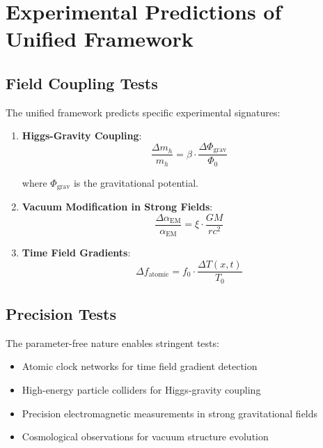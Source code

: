 \documentclass[12pt,a4paper]{article}
\newcommand{\Tfieldt}{T(x,t)}
\newcommand{\Tzero}{T_0}
\begin{document}
	\section{Experimental Predictions of Unified Framework}
	\label{sec:experimental_predictions}
	
	\subsection{Field Coupling Tests}
	\label{subsec:field_coupling_tests}
	
	The unified framework predicts specific experimental signatures:
	
	\begin{enumerate}
		\item \textbf{Higgs-Gravity Coupling}:
		\begin{equation}
			\frac{\Delta m_h}{m_h} = \beta \cdot \frac{\Delta \Phi_{\text{grav}}}{\Phi_0}
			\label{eq:higgs_gravity_coupling}
		\end{equation}
		
		where $\Phi_{\text{grav}}$ is the gravitational potential.
		
		\item \textbf{Vacuum Modification in Strong Fields}:
		\begin{equation}
			\frac{\Delta \alpha_{\text{EM}}}{\alpha_{\text{EM}}} = \xi \cdot \frac{GM}{rc^2}
			\label{eq:vacuum_modification}
		\end{equation}
		
		\item \textbf{Time Field Gradients}:
		\begin{equation}
			\Delta f_{\text{atomic}} = f_0 \cdot \frac{\Delta \Tfieldt}{\Tzero}
			\label{eq:atomic_frequency_shift}
		\end{equation}
	\end{enumerate}
	
	\subsection{Precision Tests}
	\label{subsec:precision_tests}
	
	The parameter-free nature enables stringent tests:
	\begin{itemize}
		\item Atomic clock networks for time field gradient detection
		\item High-energy particle colliders for Higgs-gravity coupling
		\item Precision electromagnetic measurements in strong gravitational fields
		\item Cosmological observations for vacuum structure evolution
	\end{itemize}
	
\end{document}
